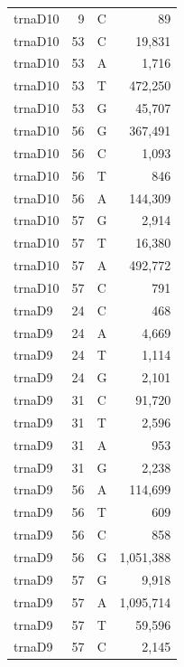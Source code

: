 \documentclass[12pt]{rockefeller}
\begin{document}
{\begin{center}
\begin{supertabular}{|l|r|c|r|}
 trnaD10 &         9 &          C &         89 \\
 trnaD10 &        53 &          C &     19,831 \\
 trnaD10 &        53 &          A &      1,716 \\
 trnaD10 &        53 &          T &    472,250 \\
 trnaD10 &        53 &          G &     45,707 \\
 trnaD10 &        56 &          G &    367,491 \\
 trnaD10 &        56 &          C &      1,093 \\
 trnaD10 &        56 &          T &        846 \\
 trnaD10 &        56 &          A &    144,309 \\
 trnaD10 &        57 &          G &      2,914 \\
 trnaD10 &        57 &          T &     16,380 \\
 trnaD10 &        57 &          A &    492,772 \\
 trnaD10 &        57 &          C &        791 \\
  trnaD9 &        24 &          C &        468 \\
  trnaD9 &        24 &          A &      4,669 \\
  trnaD9 &        24 &          T &      1,114 \\
  trnaD9 &        24 &          G &      2,101 \\
  trnaD9 &        31 &          C &     91,720 \\
  trnaD9 &        31 &          T &      2,596 \\
  trnaD9 &        31 &          A &        953 \\
  trnaD9 &        31 &          G &      2,238 \\
  trnaD9 &        56 &          A &    114,699 \\
  trnaD9 &        56 &          T &        609 \\
  trnaD9 &        56 &          C &        858 \\
  trnaD9 &        56 &          G &  1,051,388 \\
  trnaD9 &        57 &          G &      9,918 \\
  trnaD9 &        57 &          A &  1,095,714 \\
  trnaD9 &        57 &          T &     59,596 \\
  trnaD9 &        57 &          C &      2,145 \\

\end{supertabular}
\end{center}}
\end{document}
